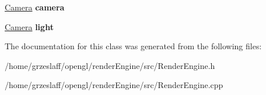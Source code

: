 \begin{DoxyCompactItemize}
\item 
\hypertarget{classRenderEngine_a9a46fc80c905cf8cca7f74f8068829d4}{\hyperlink{classCamera}{Camera} {\bfseries camera}}\label{classRenderEngine_a9a46fc80c905cf8cca7f74f8068829d4}

\item 
\hypertarget{classRenderEngine_ac14a8e4c2cd8ab7cbe2878aea5121248}{\hyperlink{classCamera}{Camera} {\bfseries light}}\label{classRenderEngine_ac14a8e4c2cd8ab7cbe2878aea5121248}

\end{DoxyCompactItemize}


The documentation for this class was generated from the following files\-:\begin{DoxyCompactItemize}
\item 
/home/grzeslaff/opengl/render\-Engine/src/Render\-Engine.\-h\item 
/home/grzeslaff/opengl/render\-Engine/src/Render\-Engine.\-cpp\end{DoxyCompactItemize}
